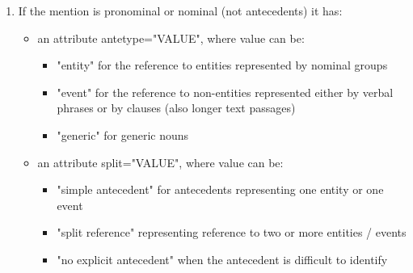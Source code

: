 \documentclass[a4paper]{article}
\begin{document}
{{\begin{enumerate}
\begin{itemize}
 \item an attribute position="VALUE"  and the VALUE can be:
 \begin{itemize}
 \item  "none"
  \item "it (subject)" for all pronouns in subject position (in both languages)
\item "it (non-subject)" for all pronouns in non-subject position (in both languages)
 \end{itemize}
 
 \item an attribute type\_of\_pronoun="VALUE" and the VALUE can be:
 \begin{itemize}
 \item "personal"
 \item "possessive"
 \item "demonstrative" (quantifiers like both boys are also marked as demonstratives)
 \item "reflexive"
 \item "relative"
 \item "none"
 \end{itemize}

\end{itemize}

\item If the mention is pronominal or nominal (not antecedents) it has:
\begin{itemize}
\item an attribute antetype="VALUE", where value can be:
\begin{itemize}
\item "entity" for the reference to entities represented by nominal groups
\item "event" for the reference to non-entities represented either by verbal phrases or by clauses (also longer text passages)
\item "generic" for generic nouns
\end{itemize}
 
 \item an attribute split="VALUE", where value can be:
 \begin{itemize}
 \item "simple antecedent" for antecedents representing one entity or one event
 \item "split reference" representing reference to two or more entities / events
 \item "no explicit antecedent" when the antecedent is difficult to identify
 \end{itemize}
 

\end{itemize}
\end{enumerate}}}
\end{document}
